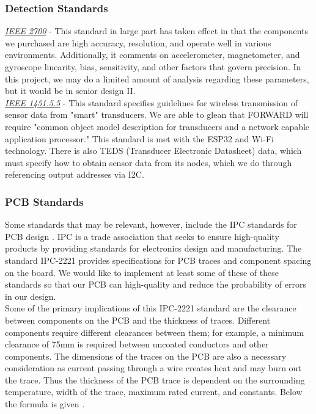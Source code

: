\subsubsection{Detection Standards}
\noindent \underline{\textit{IEEE 2700}} - This standard in large part has taken effect in that the components we purchased are high accuracy, resolution, and operate well in various environments. Additionally, it comments on accelerometer, magnetometer, and gyroscope linearity, bias, sensitivity, and other factors that govern precision. In this project, we may do a limited amount of analysis regarding these parameters, but it would be in senior design II. \cite{sensor-standards-ieee}\\

\noindent \underline{\textit{IEEE 1451.5.5}} - This standard specifies guidelines for wireless transmission of sensor data from "smart" transducers. We are able to glean that FORWARD will require "common object model description for transducers and a network capable application processor." This standard is met with the ESP32 and Wi-Fi technology. There is also TEDS (Transducer Electronic Datasheet) data, which must specify how to obtain sensor data from its nodes, which we do through referencing output addresses via I2C. \cite{wireless-sensor-data-tx-ieee}\\

\subsubsection{PCB Standards}
\noindent Some standards that may be relevant, however, include the IPC standards for PCB design \cite{ipc2221}. IPC is a trade association that seeks to ensure high-quality products by providing standards for electronics design and manufacturing. The standard IPC-2221 provides specifications for PCB traces and component spacing on the board. We would like to implement at least some of these of these standards so that our PCB can high-quality and reduce the probability of errors in our design. \\ 

\noindent Some of the primary implications of this IPC-2221 standard are the clearance between components on the PCB and the thickness of traces. Different components require different clearances between them; for example, a minimum clearance of 75mm is required between uncoated conductors and other components. The dimensions of the traces on the PCB are also a necessary consideration as current passing through a wire creates heat and may burn out the trace. Thus the thickness of the PCB trace is dependent on the surrounding temperature, width of the trace, maximum rated current, and constants. Below the formula is given \cite{ipc2221}. \\

